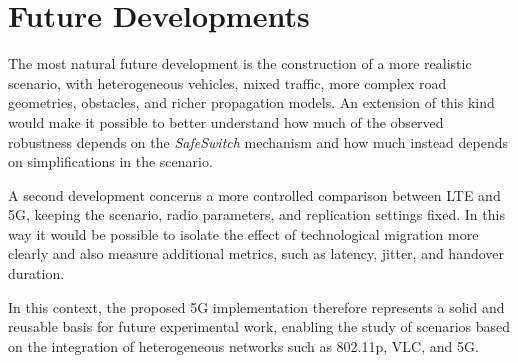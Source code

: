 \section{Future Developments}

The most natural future development is the construction of a more realistic scenario, with heterogeneous vehicles, mixed traffic, more complex road geometries, obstacles, and richer propagation models. An extension of this kind would make it possible to better understand how much of the observed robustness depends on the \emph{SafeSwitch} mechanism and how much instead depends on simplifications in the scenario.

A second development concerns a more controlled comparison between LTE and 5G, keeping the scenario, radio parameters, and replication settings fixed. In this way it would be possible to isolate the effect of technological migration more clearly and also measure additional metrics, such as latency, jitter, and handover duration.

In this context, the proposed 5G implementation therefore represents a solid and reusable basis for future experimental work, enabling the study of scenarios based on the integration of heterogeneous networks such as 802.11p, VLC, and 5G.
